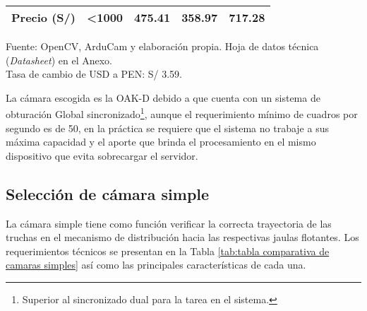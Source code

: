\begin{savenotes}
\begin{mytable}[H]
\begin{tabular}{l|c|c|c|c|}
{\begin{minipage}{\myforthmaxsizeofcontenttable}
				\textbf{Precio (S/)}
			\end{minipage}
		} & <1000 & 475.41 & 358.97 & 717.28 \\ \hline
	\end{tabular}
	\begin{myflushcenteraftertable}	
		Fuente: OpenCV, ArduCam y elaboración propia. Hoja de datos técnica (\textit{Datasheet}) en el Anexo.\\
		Tasa de cambio de USD a PEN: S/ 3.59.
	\end{myflushcenteraftertable}
\end{mytable}
\end{savenotes}

La cámara escogida es la OAK-D debido a que cuenta con un sistema de obturación Global sincronizado\footnote{Superior al sincronizado dual para la tarea en el sistema.}, aunque el requerimiento mínimo de cuadros por segundo es de 50, en la práctica se requiere que el sistema no trabaje a sus máxima capacidad y el aporte que brinda el procesamiento en el mismo dispositivo que evita sobrecargar el servidor.

\subsection{Selección de cámara simple}
	
La cámara simple tiene como función verificar la correcta trayectoria de las truchas en el mecanismo de distribución hacia las respectivas jaulas flotantes. Los requerimientos técnicos se presentan en la Tabla \ref{tab:tabla comparativa de camaras simples} así como las principales características de cada una.


